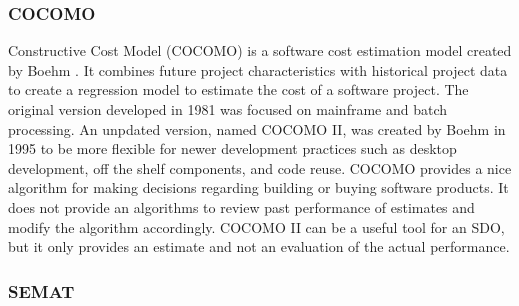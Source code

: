 \documentclass[SDSUThesis.tex]{subfiles}
\begin{document}
\subsubsection{COCOMO}  
    Constructive Cost Model (COCOMO) is a software cost estimation model created
    by Boehm \cite{Boehm1981}.  It combines future project characteristics
    with historical project data to create a regression model to estimate the 
    cost of a software project.  The original version developed in 1981 was
    focused on mainframe and batch processing.  An unpdated version, named
    COCOMO II, was created by Boehm in 1995 to be more flexible for newer 
    development practices such as desktop development, off the shelf components,
    and code reuse.  COCOMO provides a nice algorithm for making decisions
    regarding building or buying software products.  It does not provide 
    an algorithms to review past performance of estimates and modify the
    algorithm accordingly.  COCOMO II can be a useful tool for an SDO,
    but it only provides an estimate and not an evaluation of the actual
    performance.



\subsubsection{SEMAT}
\end{document}
